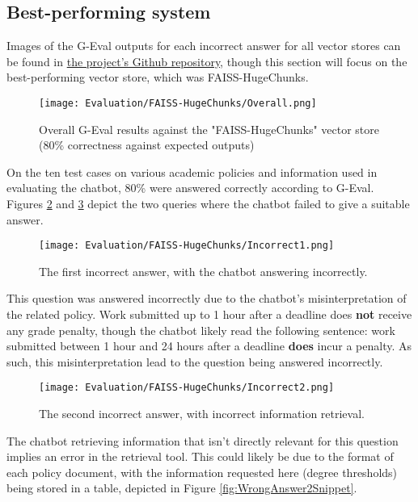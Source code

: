 \subsection{Best-performing system}
\para Images of the G-Eval outputs for each incorrect answer for all vector stores can be found in \href{https://github.com/LewGoesB00M/CMP6200/tree/main/LaTeX/.images/Evaluation}{the project's Github repository}, though this section will focus on the best-performing vector store, which was 
FAISS-HugeChunks.

\begin{figure}[H]
    \centering
    \texttt{[image: Evaluation/FAISS-HugeChunks/Overall.png]}
    \caption{Overall G-Eval results against the "FAISS-HugeChunks" vector store (80\% correctness against expected outputs) \label{fig:EvalResults}}
\end{figure}

\noindent On the ten test cases on various academic policies and information used in evaluating the chatbot,
80\% were answered correctly according to G-Eval. Figures \ref{fig:WrongAnswer1} and \ref{fig:WrongAnswer2} depict 
the two queries where the chatbot failed to give a suitable answer.

\begin{figure}[H]
    \centering
    \texttt{[image: Evaluation/FAISS-HugeChunks/Incorrect1.png]}
    \caption{The first incorrect answer, with the chatbot answering incorrectly. \label{fig:WrongAnswer1}}
\end{figure}

\noindent This question was answered incorrectly due to the chatbot's misinterpretation of the related policy. Work submitted up to 
1 hour after a deadline does \textbf{not} receive any grade penalty, though the chatbot likely read the following sentence: work submitted between 1 hour and 
24 hours after a deadline \textbf{does} incur a penalty. As such, this misinterpretation lead to the question being answered incorrectly.

\begin{figure}[H]
    \centering
    \texttt{[image: Evaluation/FAISS-HugeChunks/Incorrect2.png]}
    \caption{The second incorrect answer, with incorrect information retrieval. \label{fig:WrongAnswer2}}
\end{figure}

\noindent The chatbot retrieving information that isn't directly relevant for this question implies an error in the retrieval tool. 
This could likely be due to the format of each policy document, with the information requested here (degree thresholds) being stored in
a table, depicted in Figure \ref{fig:WrongAnswer2Snippet}.

